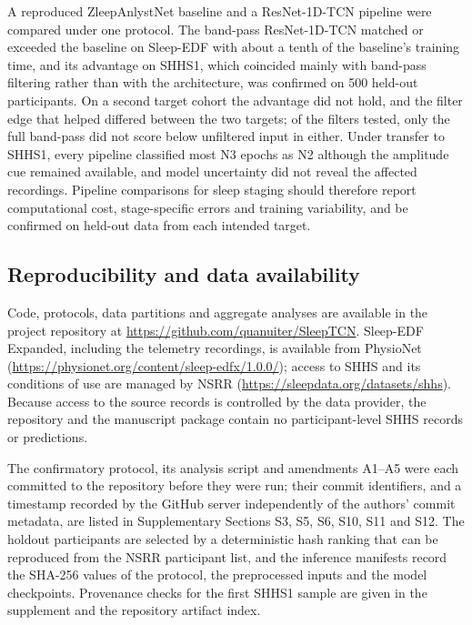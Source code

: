 \documentclass[11pt,a4paper]{article}
\begin{document}
A reproduced ZleepAnlystNet baseline and a ResNet-1D-TCN pipeline were compared under one protocol.
The band-pass ResNet-1D-TCN matched or exceeded the baseline on Sleep-EDF with about a tenth of the
baseline's training time, and its advantage on SHHS1, which coincided mainly with band-pass filtering
rather than with the architecture, was confirmed on 500 held-out participants. On a second target cohort the advantage did not hold, and the filter edge that
helped differed between the two targets; of the filters tested, only the full band-pass did not score
below unfiltered input in either. Under transfer to SHHS1,
every pipeline classified most N3 epochs as N2 although the amplitude cue remained available, and
model uncertainty did not reveal the affected recordings. Pipeline comparisons for sleep staging should
therefore report computational cost, stage-specific errors and training variability, and be confirmed
on held-out data from each intended target.

\subsection*{Reproducibility and data availability}

Code, protocols, data partitions and aggregate analyses are available in the project repository at
\url{https://github.com/quanuiter/SleepTCN}. Sleep-EDF Expanded, including the telemetry recordings, is available from PhysioNet
(\url{https://physionet.org/content/sleep-edfx/1.0.0/}); access to SHHS and its conditions of use are
managed by NSRR (\url{https://sleepdata.org/datasets/shhs}). Because access to the source records is
controlled by the data provider, the repository and the manuscript package contain no participant-level
SHHS records or predictions.

The confirmatory protocol, its analysis script and amendments A1--A5 were each committed to the
repository before they were run; their commit identifiers, and a timestamp recorded by the GitHub server
independently of the authors' commit metadata, are listed in Supplementary Sections S3, S5, S6, S10, S11 and S12. The holdout
participants are selected by a deterministic hash ranking that can be reproduced from the NSRR
participant list, and the inference manifests record the SHA-256 values of the protocol, the preprocessed
inputs and the model checkpoints. Provenance checks for the first SHHS1 sample are given in the
supplement and the repository artifact index.
\end{document}
